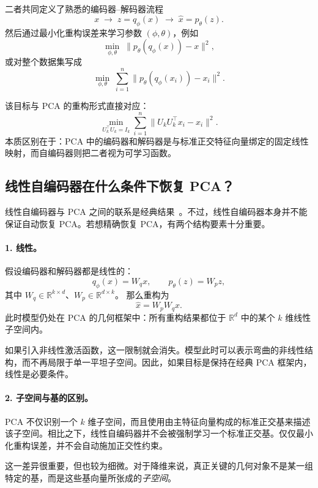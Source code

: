 二者共同定义了熟悉的编码器--解码器流程
\[
x\;\longrightarrow\;z=q_\phi(x)
\;\longrightarrow\;\hat{x}=p_\theta(z).
\]
然后通过最小化重构误差来学习参数 \((\phi,\theta)\)，例如
\[
\min_{\phi,\theta}\;
\|p_\theta(q_\phi(x))-x\|^2,
\]
或对整个数据集写成
\[
\min_{\phi,\theta}\;
\sum_{i=1}^n \|p_\theta(q_\phi(x_i))-x_i\|^2.
\]

该目标与 PCA 的重构形式直接对应：
\[
\min_{U_k^\top U_k=I_k}
\sum_{i=1}^n \|U_kU_k^\top x_i-x_i\|^2.
\]
本质区别在于：PCA 中的编码器和解码器是与标准正交特征向量绑定的固定线性映射，而自编码器则把二者视为可学习函数。

\subsection{线性自编码器在什么条件下恢复 PCA？}

线性自编码器与 PCA 之间的联系是经典结果~\cite{baldi1989neural}。不过，线性自编码器本身并不能保证自动恢复 PCA。若想精确恢复 PCA，有两个结构要素十分重要。

\paragraph{1. 线性。}
假设编码器和解码器都是线性的：
\[
q_\phi(x)=W_qx,
\qquad
p_\theta(z)=W_pz,
\]
其中
\(W_q\in\mathbb{R}^{k\times d}\)、\(W_p\in\mathbb{R}^{d\times k}\)。
那么重构为
\[
\hat{x}=W_pW_qx.
\]
此时模型仍处在 PCA 的几何框架中：所有重构结果都位于 \(\mathbb{R}^d\) 中的某个 \(k\) 维线性子空间内。

如果引入非线性激活函数，这一限制就会消失。模型此时可以表示弯曲的非线性结构，而不再局限于单一平坦子空间。因此，如果目标是保持在经典 PCA 框架内，线性是必要条件。

\paragraph{2. 子空间与基的区别。}
PCA 不仅识别一个 \(k\) 维子空间，而且使用由主特征向量构成的标准正交基来描述该子空间。相比之下，线性自编码器并不会被强制学习一个标准正交基。仅仅最小化重构误差，并不会自动施加正交性约束。

这一差异很重要，但也较为细微。对于降维来说，真正关键的几何对象不是某一组特定的基，而是这些基向量所张成的\emph{子空间}。

